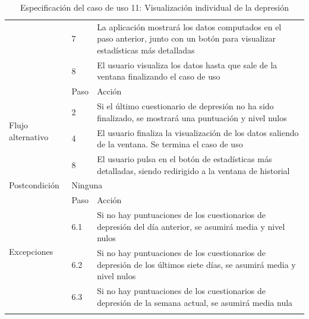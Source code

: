 \begin{table}[h]
\begin{tabularx}{\textwidth}{|l|l|X|}
            \cline{2-3} & 7 & La aplicación mostrará los datos computados en el paso anterior, junto con un botón para visualizar estadísticas más detalladas \\
            \cline{2-3} & 8 & El usuario visualiza los datos hasta que sale de la ventana finalizando el caso de uso \\
            \hline
            \multirow{4}{*}{Flujo alternativo} & Paso & Acción \\
            \cline{2-3} & 2 & Si el último cuestionario de depresión no ha sido finalizado, se mostrará una puntuación y nivel nulos \\
            \cline{2-3} & 4 & El usuario finaliza la visualización de los datos saliendo de la ventana. Se termina el caso de uso \\
            \cline{2-3} & 8 & El usuario pulsa en el botón de estadísticas más detalladas, siendo redirigido a la ventana de historial \\
            \hline
            Postcondición & \multicolumn{2}{|X|}{Ninguna} \\
            \hline
            \multirow{4}{*}{Excepciones}  & Paso & Acción \\
            \cline{2-3} & 6.1 & Si no hay puntuaciones de los cuestionarios de depresión del día anterior, se asumirá media y nivel nulos \\
            \cline{2-3} & 6.2 & Si no hay puntuaciones de los cuestionarios de depresión de los últimos siete días, se asumirá media y nivel nulos \\
            \cline{2-3} & 6.3 & Si no hay puntuaciones de los cuestionarios de depresión de la semana actual, se asumirá media nula \\
            \hline
            \caption{Especificación del caso de uso 11: Visualización individual de la depresión}
            \label{tabla:casos_uso:visualizacion_individual_depresion}
        \end{tabularx}
    \end{table}

